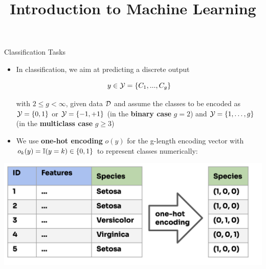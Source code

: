 \documentclass[11pt,compress,t,notes=noshow, xcolor=table]{beamer}
\title{Introduction to Machine Learning}
\begin{document}


\begin{vbframe}{Classification Tasks}

\begin{itemize}
\item In classification, we aim at predicting a discrete output 

$$
y \in \mathcal{Y} = \{C_1, ..., C_g\}
$$

with $2 \le g < \infty$, given data $\mathcal{D}$ and assume the classes to be encoded as $\mathcal{Y} = \{0, 1\}$ or $\mathcal{Y} = \{-1, +1\}$ (in the \textbf{binary case} $g = 2$) and $\mathcal{Y} = \{1, \ldots, g\}$  (in the \textbf{multiclass case} $g \ge 3$)

\item We use \textbf{one-hot encoding} $o(y)$ for the g-length encoding vector with $o_k(y) = \mathbb{I}(y = k) \in \{0,1\}$ to represent classes numerically:

\end{itemize}

\begin{center}
  \includegraphics[width=0.65\linewidth]{figure_man/one-hot_encoding.png} 
\end{center}

\end{vbframe}
\end{document}
